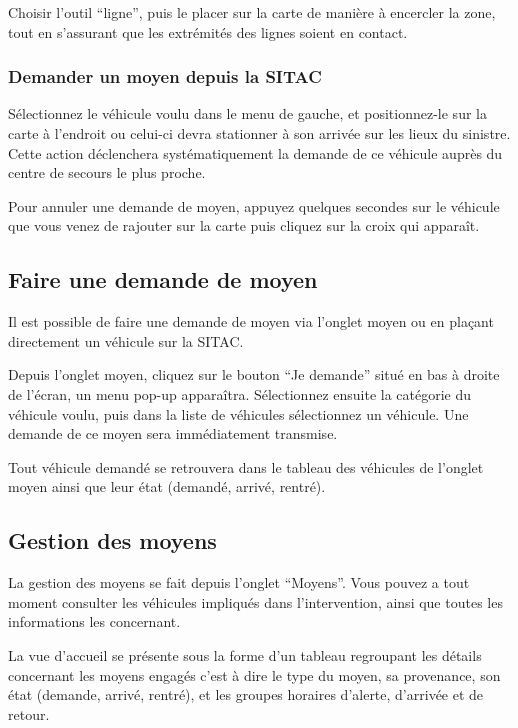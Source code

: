 \documentclass{article}
\begin{document}
Choisir l’outil “ligne”, puis le placer sur la carte de manière à encercler la zone, tout en s’assurant que les extrémités des lignes soient en contact.


\subsubsection{Demander un moyen depuis la SITAC}

Sélectionnez le véhicule voulu dans le menu de gauche, et positionnez-le sur la carte à l’endroit ou celui-ci devra stationner à son arrivée sur les lieux du sinistre. Cette action déclenchera systématiquement la demande de ce véhicule auprès du centre de secours le plus proche.

Pour annuler une demande de moyen, appuyez quelques secondes sur le véhicule que vous venez de rajouter sur la carte puis cliquez sur la croix qui apparaît.


\subsection{Faire une demande de moyen}

Il est possible de faire une demande de moyen via l’onglet moyen ou en plaçant directement un véhicule sur la SITAC.

Depuis l’onglet moyen, cliquez sur le bouton “Je demande” situé en bas à droite de l’écran, un menu pop-up apparaîtra. Sélectionnez ensuite la catégorie du véhicule voulu, puis dans la liste de véhicules sélectionnez un véhicule. Une demande de ce moyen sera immédiatement transmise.

Tout véhicule demandé se retrouvera dans le tableau des véhicules de l’onglet moyen ainsi que leur état (demandé, arrivé, rentré).


\subsection{Gestion des moyens }

La gestion des moyens se fait depuis l’onglet “Moyens”. Vous pouvez a tout moment consulter les véhicules impliqués dans l’intervention, ainsi que toutes les informations les concernant.

La vue d'accueil se présente sous la forme d’un tableau regroupant les détails concernant les moyens engagés c’est à dire le type du moyen, sa provenance, son état (demande, arrivé, rentré), et les groupes horaires d’alerte, d’arrivée et de retour.
\end{document}
